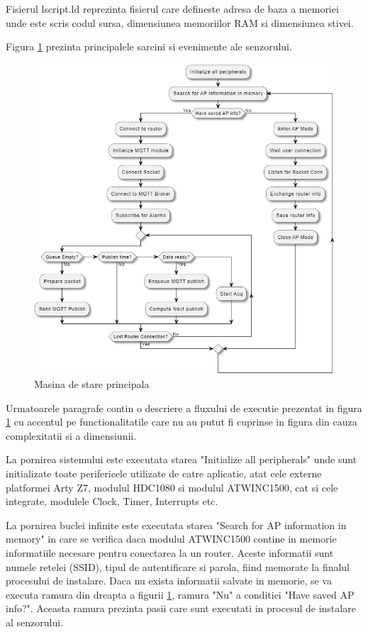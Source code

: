 Fisierul lscript.ld reprezinta fisierul care defineste adresa de baza a memoriei unde este scris codul sursa, dimensiunea memoriilor RAM si dimensiunea stivei.

Figura \ref{fig:PI_MainStateMachine} prezinta principalele sarcini si evenimente ale senzorului.
\begin{figure}[H]
    \centering
    \includegraphics[scale=0.66]{figs/PI_MainStateMachine.png}
    \caption{Masina de stare principala}
    \label{fig:PI_MainStateMachine}
\end{figure}

Urmatoarele paragrafe contin o descriere a fluxului de executie prezentat in figura \ref{fig:PI_MainStateMachine} cu accentul pe functionalitatile care nu au putut 
fi cuprinse in figura din cauza complexitatii si a dimensiunii. 

La pornirea sistemului este executata starea "Initialize all peripherals" unde sunt initializate toate perifericele utilizate de catre aplicatie, atat cele externe 
platformei Arty Z7, modulul HDC1080 si modulul ATWINC1500, cat si cele integrate, modulele Clock, Timer, Interrupts etc.

La pornirea buclei infinite este executata starea "Search for AP information in memory" in care se verifica daca modulul ATWINC1500 contine in memorie informatiile 
necesare pentru conectarea la un router. Aceste informatii sunt numele retelei (SSID), tipul de autentificare si parola, fiind memorate la finalul procesului de instalare. 
Daca nu exista informatii salvate in memorie, se va executa ramura din dreapta a figurii \ref{fig:PI_MainStateMachine}, ramura "Nu" a conditiei "Have saved AP info?". 
Aceasta ramura prezinta pasii care sunt executati in procesul de instalare al senzorului.

